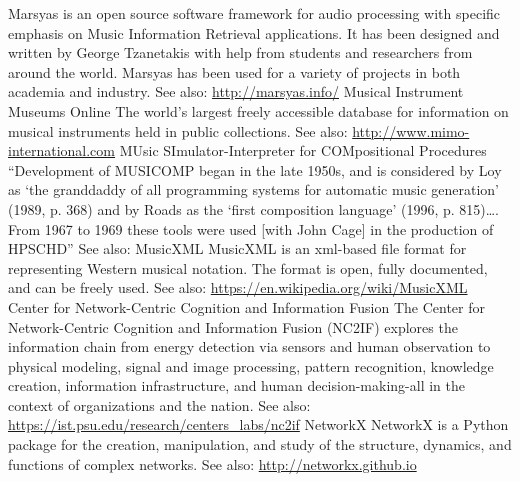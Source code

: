 	{Marsyas is an open source software framework for audio processing with specific emphasis on Music Information Retrieval applications. It has been designed and written by George Tzanetakis with help from students and researchers from around the world. Marsyas has been used for a variety of projects in both academia and industry. See also: \url{http://marsyas.info/}}
	{Musical Instrument Museums Online}
	{The world's largest freely accessible database for information on musical instruments held in public collections. See also: \url{http://www.mimo-international.com}}
	{MUsic SImulator-Interpreter for COMpositional Procedures}
	{``Development of MUSICOMP began in the late 1950s, and is considered by Loy as `the granddaddy of all programming systems for automatic music generation' (1989, p. 368) and by Roads as the `first composition language' (1996, p. 815)\dots. From 1967 to 1969 these tools were used [with John Cage] in the production of HPSCHD'' See also: \url{} \parencite[44]{Ari05:Ano}}
	{MusicXML}
	{MusicXML is an \gls{xml}-based file format for representing Western musical notation. The format is open, fully documented, and can be freely used. See also: \url{https://en.wikipedia.org/wiki/MusicXML}}
	{Center for Network-Centric Cognition and Information Fusion}
	{ The Center for Network-Centric Cognition and Information Fusion (NC2IF) explores the information chain from energy detection via sensors and human observation to physical modeling, signal and image processing, pattern recognition, knowledge creation, information infrastructure, and human decision-making-all in the context of organizations and the nation. See also: \url{https://ist.psu.edu/research/centers_labs/nc2if}}
	{NetworkX}
	{NetworkX is a Python package for the creation, manipulation, and study of the structure, dynamics, and functions of complex networks. See also: \url{http://networkx.github.io}}
